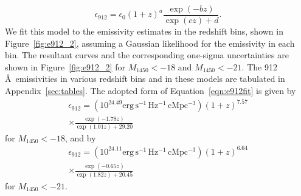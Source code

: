 \documentclass[fleqn,usenatbib]{mnras}
\begin{document}
\begin{equation}
  \epsilon_{912}=\epsilon_0(1+z)^a\frac{\exp(-bz)}{\exp(cz)+d}.
  \label{eqn:e912fit}
\end{equation}
We fit this model to the emissivity estimates in the redshift bins,
shown in Figure~\ref{fig:e912_2}, assuming a Gaussian likelihood for
the emissivity in each bin.  The resultant curves and the
corresponding one-sigma uncertainties are shown in
Figure~\ref{fig:e912_2} for $M_{1450}<-18$ and $M_{1450}<-21$.  The
912\,\AA\ emissivities in various redshift bins and in these 
models are tabulated in Appendix~\ref{sec:tables}.  The adopted
form of Equation~\ref{eqn:e912fit} is given by
\begin{multline}
  \epsilon_{912}=(10^{24.49}\mathrm{erg\, s^{-1}\, Hz^{-1}\, cMpc^{-3}})(1+z)^{7.57}\\\times\frac{\exp(-1.78z)}{\exp(1.01z)+29.20}
\end{multline}
for $M_{1450}<-18$, and by 
\begin{multline}
  \epsilon_{912}=(10^{24.11}\mathrm{erg\, s^{-1}\, Hz^{-1}\, cMpc^{-3}})(1+z)^{6.64}\\\times\frac{\exp(-0.65z)}{\exp(1.82z)+20.45}
\end{multline}
for $M_{1450}<-21$.

\end{document}

